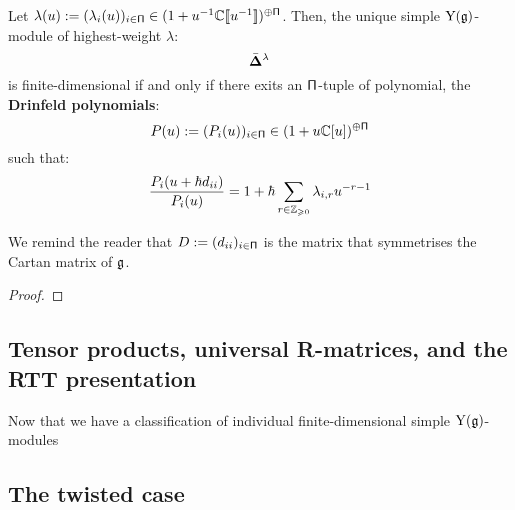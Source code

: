         \begin{theorem} \label{theorem: classification_of_finite_dimensional_simple_modules_of_finite_untwisted_yangians}
            Let $\lambda(u) := ( \lambda_i(u) )_{i \in \mathsf{\Pi}} \in (1 + u^{-1}\mathbb{C}[\![u^{-1}]\!])^{\oplus \mathsf{\Pi}}$. Then, the unique simple $\mathrm{Y}(\mathfrak{g})$-module of highest-weight $\lambda$:
                $$\bar{ \mathbf{ \Delta } }^{\lambda}$$
            is finite-dimensional if and only if there exits an $\mathsf{\Pi}$-tuple of polynomial, the \textbf{Drinfeld polynomials}:
                $$P(u) := ( P_i(u) )_{i \in \mathsf{\Pi}} \in (1 + u\mathbb{C}[u])^{\oplus \mathsf{\Pi}}$$
            such that:
                $$\frac{P_i(u + \hbar d_{ii})}{P_i(u)} = 1 + \hbar \sum_{r \in \mathbb{Z}_{\geqslant 0}} \lambda_{i, r} u^{-r - 1}$$
        \end{theorem}
        We remind the reader that $D := (d_{ii})_{i \in \mathsf{\Pi}}$ is the matrix that symmetrises the Cartan matrix of $\mathfrak{g}$.
            \begin{proof}
                
            \end{proof}
        \begin{definition} \label{def: dominant_integral_weights_yangians}
            
        \end{definition}


    \subsection{Tensor products, universal R-matrices, and the RTT presentation} \label{subsection: universal_R_matrices_of_finite_yangians}
        Now that we have a classification of individual finite-dimensional simple $\mathrm{Y}(\mathfrak{g})$-modules

    \subsection{The twisted case}